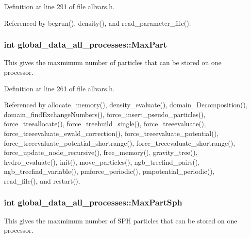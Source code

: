 Definition at line 291 of file allvars.h.



Referenced by begrun(), density(), and read\_\-parameter\_\-file().

\hypertarget{structglobal__data__all__processes_a413b30e91ae833d0c78b42744a99e67f}{
\subsubsection[{MaxPart}]{\setlength{\rightskip}{0pt plus 5cm}int {\bf global\_\-data\_\-all\_\-processes::MaxPart}}}
\label{structglobal__data__all__processes_a413b30e91ae833d0c78b42744a99e67f}
This gives the maxmimum number of particles that can be stored on one processor. 

Definition at line 261 of file allvars.h.



Referenced by allocate\_\-memory(), density\_\-evaluate(), domain\_\-Decomposition(), domain\_\-findExchangeNumbers(), force\_\-insert\_\-pseudo\_\-particles(), force\_\-treeallocate(), force\_\-treebuild\_\-single(), force\_\-treeevaluate(), force\_\-treeevaluate\_\-ewald\_\-correction(), force\_\-treeevaluate\_\-potential(), force\_\-treeevaluate\_\-potential\_\-shortrange(), force\_\-treeevaluate\_\-shortrange(), force\_\-update\_\-node\_\-recursive(), free\_\-memory(), gravity\_\-tree(), hydro\_\-evaluate(), init(), move\_\-particles(), ngb\_\-treefind\_\-pairs(), ngb\_\-treefind\_\-variable(), pmforce\_\-periodic(), pmpotential\_\-periodic(), read\_\-file(), and restart().

\hypertarget{structglobal__data__all__processes_a43dccd3997af759d43a2f3bcce44a2c4}{
\subsubsection[{MaxPartSph}]{\setlength{\rightskip}{0pt plus 5cm}int {\bf global\_\-data\_\-all\_\-processes::MaxPartSph}}}
\label{structglobal__data__all__processes_a43dccd3997af759d43a2f3bcce44a2c4}
This gives the maxmimum number of SPH particles that can be stored on one processor. 


